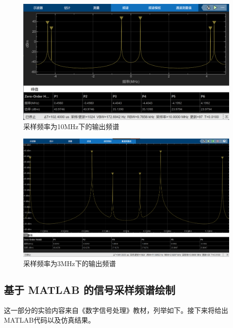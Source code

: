 \begin{figure}[htbp]
  \centering
  \includegraphics[width=.75\textwidth]{figure/exp1/10M.png}
  \caption{采样频率为10MHz下的输出频谱}
  \label{fig:spectrum10}
\end{figure}
\begin{figure}[htbp]
  \centering
  \includegraphics[width=.75\textwidth]{figure/exp1/3M.png}
  \caption{采样频率为3MHz下的输出频谱}
  \label{fig:spectrum3}
\end{figure}
\subsection{基于 MATLAB 的信号采样频谱绘制}
这一部分的实验内容来自《数字信号处理》教材，列举如下。接下来将给出MATLAB代码以及仿真结果。

